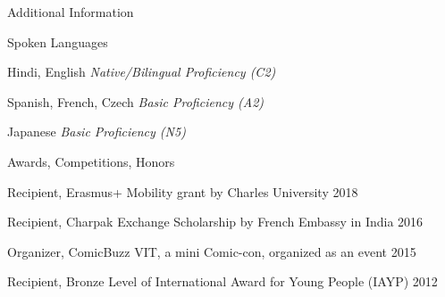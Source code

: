 
\begin{rSection}{\faInfoCircle \hspace{0.5mm} Additional Information}
 
    \begin{rSubsection}{\faVolumeUp \hspace{0.5mm} Spoken Languages}{}{}{}
        \item Hindi, English \hfill {\em Native/Bilingual Proficiency (C2)}
        \item Spanish, French, Czech \hfill {\em Basic Proficiency (A2)}
        \item Japanese \hfill {\em Basic Proficiency (N5)}
    \end{rSubsection}

    \begin{rSubsection}{\faTrophy \hspace{0.5mm} Awards, Competitions, Honors}{}{}
    
        \item Recipient, Erasmus+ Mobility grant by Charles University
            \hfill {2018}
        
        \item Recipient, Charpak Exchange Scholarship by French Embassy in India 
            \hfill {2016}
        
        \item {Organizer, ComicBuzz VIT, a mini Comic-con, organized as an 
            event} \hfill {2015}
        
        \item Recipient, Bronze Level of International Award for Young People (IAYP)
            \hfill {2012}
    
    \end{rSubsection}

\end{rSection}
